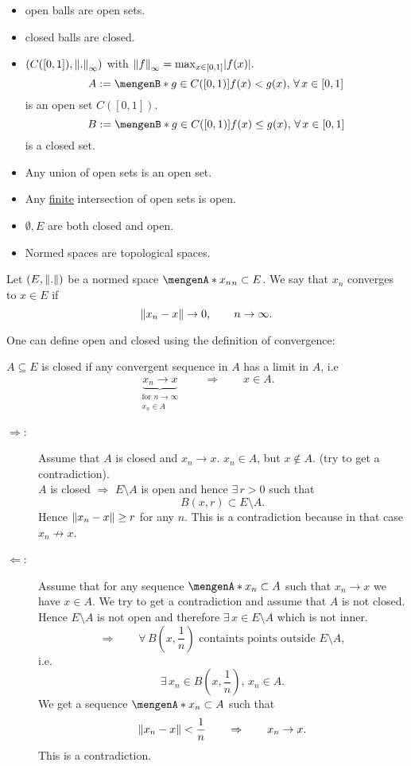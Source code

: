 \begin{bemerkung}
	\begin{itemize}
		\item open balls are open sets.
		\item closed balls are closed.
		\item $(C([0,1]),\norm{.}_{\infty})$ with $\norm{f}_{\infty}= \max_{x \in [0,1]}\abs{f(x)}.$ 
		\[
			A := \set[g \in C([0,1])]{f(x) < g(x),\,\forall\, x \in [0,1]}
		\]
		is an open set $C([0,1])$.
		\[
			B := \set[g \in C([0,1])]{f(x) \leq g(x),\,\forall\, x \in [0,1]}
 		\]
		is a closed set.
	\end{itemize}
	\begin{itemize}
		\item Any union of open sets is an open set.
		\item Any \underline{finite} intersection of open sets is open.
		\item $\emptyset,E$ are both closed and open.
		\item Normed spaces are topological spaces.
	\end{itemize}
\end{bemerkung}
\begin{definition*}
	Let $(E,\norm{.})$ be a normed space $\set{x_n}_n \subset E$. We say that $x_n$ converges to $x \in E$ if 
	\[
		\norm{x_n-x} \to 0, \qquad n \to \infty.
	\]
\end{definition*}
One can define open and closed using the definition of convergence:
\begin{satz} %
	$A \subseteq E$ is closed if any convergent sequence in $A$ has a limit in $A$, i.e
	\[
		\underset{\substack{\text{for }n \to \infty \\ x_n \in A}}{\underbrace{x_n \to x}} \qquad  \Rightarrow \qquad  x \in A.
	\]
\end{satz}
\begin{beweis}
	\begin{description}
		\item[$\Rightarrow$:]Assume that $A$ is closed and $x_n \to x$. $x_n \in A$, but $x \not \in A$. (try to get a contradiction). \\
	 $A$ is closed $\Rightarrow $ $E \setminus A$ is open and hence $\exists\, r >0$ such that
	 \[
	 	B(x,r) \subset E \setminus A.
	 \]
	 Hence $\norm{x_n -x} \geq r$ for any $n$. This is a contradiction because in that case $x_n \not \to x$.
	 \item[$\Leftarrow $:] Assume that for any sequence $\set{x_n} \subset A$ such that $x_n \to x$ we have $x \in A$. We try to get a contradiction and assume that $A$ is not closed. Hence $E \setminus A$ is not open and therefore $\exists\, x \in E \setminus A$ which is not inner.
	 \[
	 	\Rightarrow \qquad  \forall\, B(x,\frac{1}{n}) \text{ containts points outside }E \setminus A, 
	 \]
	 i.e.
	 \[
	 	\exists\, x_n \in B(x, \frac{1}{n}), \, x_n \in A.
	 \]
	 We get a sequence $\set{x_n} \subset A$ such that
	 \[
	 	\norm{x_n-x} < \frac{1}{n} \qquad \Rightarrow \qquad x_n \to x.
	 \]
	 This is a contradiction.
	\end{description}
\end{beweis}

